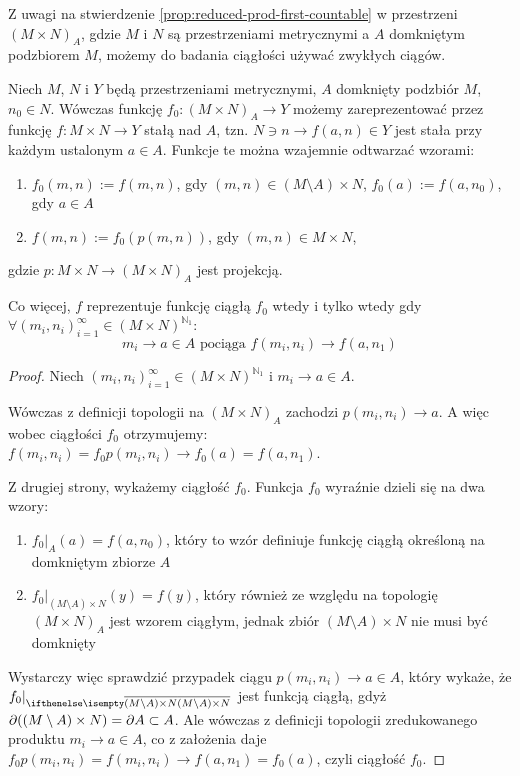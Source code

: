 Z uwagi na stwierdzenie \ref{prop:reduced-prod-first-countable} w przestrzeni $(M\times N)_A$, gdzie $M$ i $N$ są przestrzeniami metrycznymi a $A$ domkniętym podzbiorem $M$, możemy do badania ciągłości używać zwykłych ciągów.

\begin{lem} \label{lem:reduced-product-continuous}
  Niech $M$, $N$ i $Y$ będą przestrzeniami metrycznymi, $A$ domknięty podzbiór $M$, $n_0 \in N$. Wówczas funkcję $f_0: (M \times N)_A \rightarrow Y$ możemy zareprezentować przez funkcję $f: M \times N \rightarrow Y$ stałą nad $A$, tzn. $N \ni n \rightarrow f(a, n) \in Y$ jest stała przy każdym ustalonym $a \in A$. Funkcje te można wzajemnie odtwarzać wzorami:
  \begin{enumerate}
   \item $f_0(m,n) := f(m,n)$, gdy $(m,n) \in (M \setminus A) \times N$, $f_0(a) := f(a, n_0)$, gdy $a \in A$
   \item $f(m,n) := f_0(p(m,n))$, gdy $(m,n) \in M \times N$,
  \end{enumerate}
  gdzie $p: M\times N \to (M\times N)_A$ jest projekcją.

  
  Co więcej, $f$ reprezentuje funkcję ciągłą $f_0$ wtedy i tylko wtedy gdy $\forall (m_i, n_i)_{i=1}^\infty \in (M \times N)^{\mathbb{N}_1}:$
  \[m_i \rightarrow a \in A \mbox{ pociąga } f(m_i, n_i) \rightarrow f(a, n_1)\]
  
  \begin{proof}
    Niech $(m_i, n_i)_{i=1}^\infty \in (M \times N)^{\mathbb{N}_1}$ i $m_i \rightarrow a \in A$.
    
    Wówczas z definicji topologii na $(M \times N)_A$ zachodzi $p(m_i, n_i) \rightarrow a$. A więc wobec ciągłości $f_0$ otrzymujemy: $f(m_i, n_i) = f_0 p(m_i, n_i) \rightarrow f_0(a) = f(a, n_1)$.
    
    Z drugiej strony, wykażemy ciągłość $f_0$. Funkcja $f_0$ wyraźnie dzieli się na dwa wzory:
    \begin{enumerate}
     \item $f_0|_A(a) = f(a, n_0)$, który to wzór definiuje funkcję ciągłą określoną na domkniętym zbiorze $A$
     \item $f_0|_{(M \setminus A) \times N}(y) = f(y)$, który również ze względu na topologię $(M \times N)_A$ jest wzorem ciągłym, jednak zbiór $(M \setminus A) \times N$ nie musi być domknięty
    \end{enumerate}
    Wystarczy więc sprawdzić przypadek ciągu $p(m_i, n_i) \rightarrow a \in A$, który wykaże, że $f_0|_{\cl{(M \setminus A) \times N}}$ jest funkcją ciągłą, gdyż $\partial((M \setminus A) \times N) = \partial A \subset A$. Ale wówczas z definicji topologii zredukowanego produktu $m_i \rightarrow a \in A$, co z założenia daje $f_0 p(m_i, n_i) = f(m_i, n_i) \rightarrow f(a, n_1) = f_0(a)$, czyli ciągłość $f_0$.
  \end{proof}
\end{lem}


